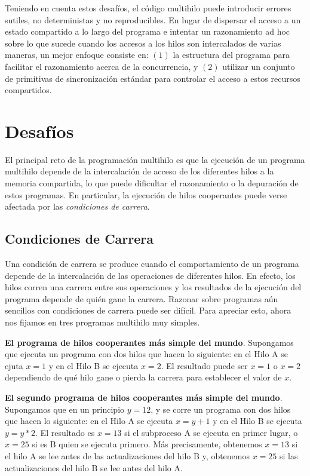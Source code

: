 \documentclass[10pt]{book}
\begin{document}
Teniendo en cuenta estos desafíos, el código multihilo puede introducir errores sutiles, no deterministas y no reproducibles. En lugar de dispersar el acceso a un estado compartido a lo largo del programa e intentar un razonamiento ad hoc sobre lo que sucede cuando los accesos a los hilos son intercalados de varias maneras, un mejor enfoque consiste en: $(1)$ la estructura del programa para facilitar el razonamiento acerca de la concurrencia, y $(2)$ utilizar un conjunto de primitivas de sincronización estándar para controlar el acceso a estos recursos compartidos.

\section{Desafíos}
El principal reto de la programación multihilo es que la ejecución de un programa multihilo depende de la intercalación de acceso de los diferentes hilos a la memoria compartida, lo que puede dificultar el razonamiento o la depuración de estos programas. En particular, la ejecución de hilos cooperantes puede verse afectada por las \textit{condiciones de carrera}.

\subsection{Condiciones de Carrera}
Una condición de carrera se produce cuando el comportamiento de un programa depende de la intercalación de las operaciones de diferentes hilos. En efecto, los hilos corren una carrera entre sus operaciones y los resultados de la ejecución del programa depende de quién gane la carrera. Razonar sobre programas aún sencillos con condiciones de carrera puede ser difícil. Para apreciar esto, ahora nos fijamos en tres programas multihilo muy simples.

\textbf{El programa de hilos cooperantes más simple del mundo}. Supongamos que ejecuta un programa con dos hilos que hacen lo siguiente: en el Hilo A se ejuta $x = 1$ y en el Hilo B se ejecuta $x = 2$. El resultado puede ser $x = 1$ o $x = 2$ dependiendo de qué hilo gane o pierda la carrera para establecer el valor de $x$.

\textbf{El segundo programa de hilos cooperantes más simple del mundo}. Supongamos que en un principio $y = 12$, y se corre un programa con dos hilos que hacen lo siguiente: en el Hilo A se ejecuta $x = y + 1$ y en el Hilo B se ejecuta $y = y * 2$. El resultado es $x = 13$ si el subproceso A se ejecuta en primer lugar, o $x = 25$ si es B quien se ejecuta primero. Más precisamente, obtenemos $x = 13$ si el hilo A se lee antes de las actualizaciones del hilo B y, obtenemos $x = 25$ si las actualizaciones del hilo B se lee antes del hilo A.
\end{document}
